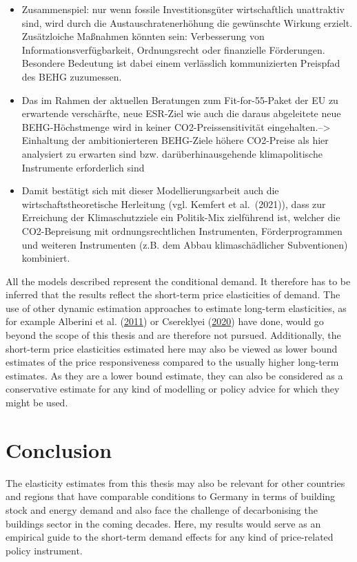 \documentclass[12pt,twoside]{reedthesis}
\begin{document}
\begin{itemize}
\item
  Zusammenspiel: nur wenn fossile Investitionsgüter wirtschaftlich unattraktiv sind, wird durch die Austauschratenerhöhung die gewünschte Wirkung erzielt. Zusätzloiche Maßnahmen könnten sein: Verbesserung von Informationsverfügbarkeit, Ordnungsrecht oder finanzielle Förderungen. Besondere Bedeutung ist dabei einem verlässlich kommunizierten Preispfad des BEHG zuzumessen.
\item
  Das im Rahmen der aktuellen Beratungen zum Fit-for-55-Paket der EU zu erwartende verschärfte, neue ESR-Ziel wie auch die daraus abgeleitete neue BEHG-Höchstmenge wird in keiner CO2-Preissensitivität eingehalten.--\textgreater{} Einhaltung der ambitionierteren BEHG-Ziele höhere CO2-Preise als hier analysiert zu erwarten sind bzw. darüberhinausgehende klimapolitische Instrumente erforderlich sind
\item
  Damit bestätigt sich mit dieser Modellierungsarbeit auch die wirtschaftstheoretische Herleitung (vgl. Kemfert et al.~(2021)), dass zur Erreichung der Klimaschutzziele ein Politik-Mix zielführend ist, welcher die CO2-Bepreisung mit ordnungsrechtlichen Instrumenten, Förderprogrammen und weiteren Instrumenten (z.B. dem Abbau klimaschädlicher Subventionen) kombiniert.
\end{itemize}
All the models described represent the conditional demand. It therefore has to be inferred that the results reflect the short-term price elasticities of demand. The use of other dynamic estimation approaches to estimate long-term elasticities, as for example Alberini et al. (\protect\hyperlink{ref-alberini_etal11}{2011}) or Csereklyei (\protect\hyperlink{ref-csereklyei20}{2020}) have done, would go beyond the scope of this thesis and are therefore not pursued. Additionally, the short-term price elasticities estimated here may also be viewed as lower bound estimates of the price responsiveness compared to the usually higher long-term estimates. As they are a lower bound estimate, they can also be considered as a conservative estimate for any kind of modelling or policy advice for which they might be used.

\hypertarget{conclusion}{%
\chapter{Conclusion}\label{conclusion}}

The elasticity estimates from this thesis may also be relevant for other countries and regions that have comparable conditions to Germany in terms of building stock and energy demand and also face the challenge of decarbonising the buildings sector in the coming decades. Here, my results would serve as an empirical guide to the short-term demand effects for any kind of price-related policy instrument.
\end{document}
